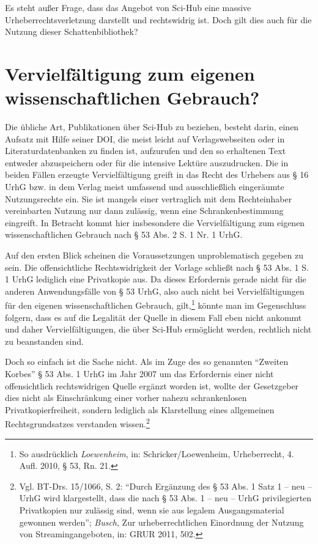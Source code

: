 \documentclass[a4paper,
fontsize=11pt,
oneside,
numbers=noperiodatend,
parskip=half-,
bibliography=totoc,
final
]{scrartcl}
\begin{document}
Es steht außer Frage, dass das Angebot von Sci-Hub eine massive
Urheberrechtsverletzung darstellt und rechtswidrig ist. Doch gilt dies
auch für die Nutzung dieser Schattenbibliothek?

\section*{Vervielfältigung zum eigenen wissenschaftlichen
Gebrauch?}\label{vervielfuxe4ltigung-zum-eigenen-wissenschaftlichen-gebrauch}

Die übliche Art, Publikationen über Sci-Hub zu beziehen, besteht darin,
einen Aufsatz mit Hilfe seiner DOI, die meist leicht auf
Verlagswebseiten oder in Literaturdatenbanken zu finden ist, aufzurufen
und den so erhaltenen Text entweder abzuspeichern oder für die intensive
Lektüre auszudrucken. Die in beiden Fällen erzeugte Vervielfältigung
greift in das Recht des Urhebers aus § 16 UrhG bzw. in dem Verlag meist
umfassend und ausschließlich eingeräumte Nutzungsrechte ein. Sie ist
mangels einer vertraglich mit dem Rechteinhaber vereinbarten Nutzung nur
dann zulässig, wenn eine Schrankenbestimmung eingreift. In Betracht
kommt hier insbesondere die Vervielfältigung zum eigenen
wissenschaftlichen Gebrauch nach § 53 Abs. 2 S. 1 Nr. 1 UrhG.

Auf den ersten Blick scheinen die Voraussetzungen unproblematisch
gegeben zu sein. Die offensichtliche Rechtswidrigkeit der Vorlage
schließt nach § 53 Abs. 1 S. 1 UrhG lediglich eine Privatkopie aus. Da
dieses Erfordernis gerade nicht für die anderen Anwendungsfälle von § 53
UrhG, also auch nicht bei Vervielfältigungen für den eigenen
wissenschaftlichen Gebrauch, gilt,\footnote{So ausdrücklich
  \emph{Loewenheim}, in: Schricker/Loewenheim, Urheberrecht, 4. Aufl.
  2010, § 53, Rn. 21.} könnte man im Gegenschluss folgern, dass es auf
die Legalität der Quelle in diesem Fall eben nicht ankommt und daher
Vervielfältigungen, die über Sci-Hub ermöglicht werden, rechtlich nicht
zu bean­standen sind.

Doch so einfach ist die Sache nicht. Als im Zuge des so genannten
\enquote{Zweiten Korbes} § 53 Abs. 1 UrhG im Jahr 2007 um das
Erfordernis einer nicht offensichtlich rechtswidrigen Quelle ergänzt
worden ist, wollte der Gesetzgeber dies nicht als Einschränkung einer
vorher nahezu schrankenlosen Privatkopierfreiheit, sondern lediglich als
Klarstellung eines allgemeinen Rechtsgrundsatzes verstanden
wissen.\footnote{Vgl. BT-Drs. 15/1066, S. 2: \enquote{Durch Ergänzung
  des § 53 Abs. 1 Satz 1 -- neu -- UrhG wird klargestellt, dass die nach
  § 53 Abs. 1 -- neu -- UrhG privilegierten Privatkopien nur zulässig
  sind, wenn sie aus legalem Ausgangsmaterial gewonnen werden};
  \emph{Busch}, Zur urheberrechtlichen Einordnung der Nutzung von
  Streamingangeboten, in: GRUR 2011, 502.}
\end{document}
